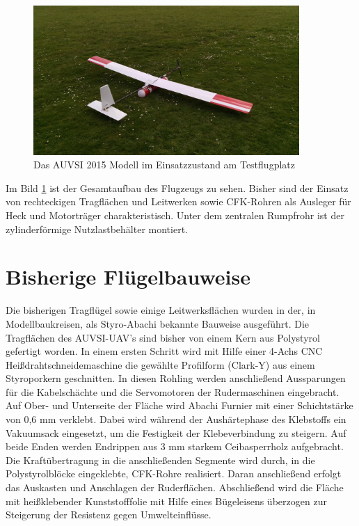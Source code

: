 \begin{figure}[H]
\centering
\includegraphics[width=0.9\textwidth]{bilder/Fotos/AUVSI_2015.jpg} 
\caption{Das AUVSI 2015 Modell im Einsatzzustand am Testflugplatz} 
\label{fig:Das AUVSI 2015 Modell in Einsatzzustand am Testflugplatz}
\end{figure}

Im Bild \ref{fig:Das AUVSI 2015 Modell in Einsatzzustand am Testflugplatz} ist der Gesamtaufbau des Flugzeugs zu sehen. Bisher sind der Einsatz von rechteckigen Tragflächen und Leitwerken sowie CFK-Rohren als Ausleger für Heck und Motorträger charakteristisch. Unter dem zentralen Rumpfrohr ist der zylinderförmige Nutzlastbehälter montiert.


\clearpage


\section{Bisherige Flügelbauweise}

Die bisherigen Tragflügel sowie einige Leitwerksflächen wurden in der, in Modellbaukreisen, als \glqq Styro-Abachi\grqq{} bekannte Bauweise ausgeführt. Die Tragflächen des AUVSI-UAV's sind bisher von einem Kern aus Polystyrol gefertigt worden. In einem ersten Schritt wird mit Hilfe einer 4-Achs CNC Heißdrahtschneidemaschine die gewählte Profilform (Clark-Y) aus einem Styroporkern geschnitten. In diesen Rohling werden anschließend Aussparungen für die Kabelschächte und die Servomotoren der Rudermaschinen eingebracht. Auf Ober- und Unterseite der Fläche wird Abachi Furnier mit einer Schichtstärke von 0,6 mm verklebt. Dabei wird während der Aushärtephase des Klebstoffs ein Vakuumsack eingesetzt, um die Festigkeit der Klebeverbindung zu steigern.
Auf beide Enden werden Endrippen aus 3 mm starkem Ceibasperrholz aufgebracht. Die Kraftübertragung in die anschließenden Segmente wird durch, in die Polystyrolblöcke eingeklebte, CFK-Rohre realisiert. Daran anschließend erfolgt das Auskasten und Anschlagen der Ruderflächen.
Abschließend wird die Fläche mit heißklebender Kunststofffolie mit Hilfe eines Bügeleisens überzogen zur Steigerung der Resistenz  gegen Umwelteinflüsse.

